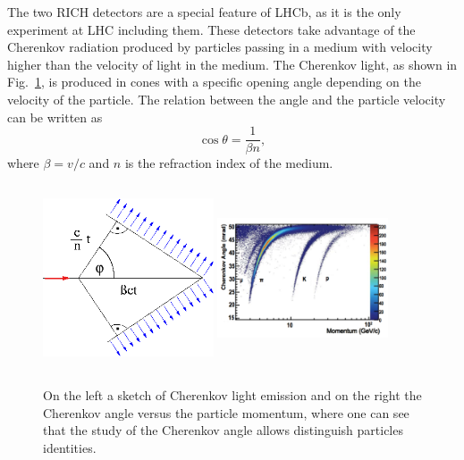 The two RICH detectors are a special feature of LHCb, as it is the only experiment at LHC including them. 
These detectors take advantage of the Cherenkov radiation produced by particles passing in a medium with velocity 
higher than the velocity of light in the medium. The Cherenkov light, as shown in Fig.~\ref{Cherenkov}, 
is produced in cones with a specific opening angle depending on the velocity of the particle. The relation
between the angle and the particle velocity can be written as 
%
\begin{equation}
\cos\theta = \frac{1}{\beta n},
\end{equation}
%
where $\beta = v/c$ and $n$ is the refraction index of the medium.
%
\begin{figure}[h!]
\centering
\includegraphics[width=0.45\textwidth,height=5.5cm]{Detector/figs/detector/Cherenkov.png}
\includegraphics[width=0.45\textwidth,height=5.5cm]{Detector/figs/changle_vs_momentum.png}
\caption{On the left a sketch of Cherenkov light emission and on the right the Cherenkov
angle versus the particle momentum, where one can see that the study of the Cherenkov angle
allows distinguish particles identities.}
\label{Cherenkov}
\end{figure}

